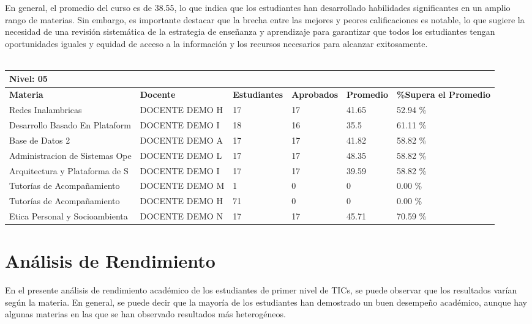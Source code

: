 En general, el promedio del curso es de 38.55, lo que indica que los estudiantes han desarrollado habilidades significantes en un amplio rango de materias. Sin embargo, es importante destacar que la brecha entre las mejores y peores calificaciones es notable, lo que sugiere la necesidad de una revisión sistemática de la estrategia de enseñanza y aprendizaje para garantizar que todos los estudiantes tengan oportunidades iguales y equidad de acceso a la información y los recursos necesarios para alcanzar exitosamente.\\
\vspace{1cm}\\\small
\begin{tabularx}{\textwidth}{|p{2.5cm}|p{2.5cm}|X|X|X|X|}
\hline
\multicolumn{6}{|X|}{\textbf{Nivel: 05 }}\\\hline\textbf{Materia} & \textbf{Docente} & \textbf{Estudiantes} & \textbf{Aprobados} & \textbf{Promedio} & \textbf{\%Supera el Promedio} \\ \hline
Redes Inalambricas & DOCENTE DEMO H & 17 & 17 & 41.65 & 52.94 \%\\ \hline
Desarrollo Basado En Plataform & DOCENTE DEMO I & 18 & 16 & 35.5 & 61.11 \%\\ \hline
Base de Datos 2 & DOCENTE DEMO A & 17 & 17 & 41.82 & 58.82 \%\\ \hline
Administracion de Sistemas Ope & DOCENTE DEMO L & 17 & 17 & 48.35 & 58.82 \%\\ \hline
Arquitectura y Plataforma de S & DOCENTE DEMO I & 17 & 17 & 39.59 & 58.82 \%\\ \hline
Tutorías de Acompañamiento & DOCENTE DEMO M & 1 & 0 & 0 & 0.00 \%\\ \hline
Tutorías de Acompañamiento & DOCENTE DEMO H & 71 & 0 & 0 & 0.00 \%\\ \hline
Etica Personal y Socioambienta & DOCENTE DEMO N & 17 & 17 & 45.71 & 70.59 \%\\ \hline
\end{tabularx}

\vspace{1cm}
\section{Análisis de Rendimiento}
En el presente análisis de rendimiento académico de los estudiantes de primer nivel de TICs, se puede observar que los resultados varían según la materia. En general, se puede decir que la mayoría de los estudiantes han demostrado un buen desempeño académico, aunque hay algunas materias en las que se han observado resultados más heterogéneos.

